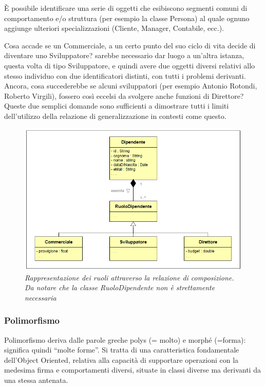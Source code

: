 È possibile identificare una serie di oggetti che esibiscono segmenti comuni di comportamento e/o struttura (per esempio la classe Persona) al quale ognuno aggiunge ulteriori specializzazioni (Cliente, Manager, Contabile, ecc.).

Cosa accade se un Commerciale, a un certo punto del suo ciclo di vita decide di diventare uno Sviluppatore? sarebbe necessario dar luogo a un’altra istanza, questa volta di tipo Sviluppatore, e quindi avere due oggetti diversi relativi allo stesso individuo con due identificatori distinti, con tutti i problemi derivanti. Ancora, cosa succederebbe se alcuni sviluppatori (per esempio Antonio Rotondi, Roberto Virgili), fossero così eccelsi da svolgere anche funzioni di Direttore? Queste due semplici domande sono sufficienti a dimostrare tutti i limiti dell’utilizzo della relazione di generalizzazione in contesti come questo.

\begin{figure}[H]
\includegraphics[scale=0.8]{images/ereditarietaOk}
\caption{\textit{Rappresentazione dei ruoli attraverso la relazione di composizione. Da notare che la classe RuoloDipendente non è strettamente necessaria} \label{fig:ered5}}
\end{figure}
\subsubsection{Polimorfismo}

Polimorfismo deriva dalle parole greche polys (= molto) e morphé (=forma): significa quindi “molte forme”. Si tratta di una caratteristica fondamentale dell'Object Oriented, relativa alla capacità di supportare operazioni con la medesima firma e comportamenti diversi, situate in classi diverse ma derivanti da una stessa antenata.

